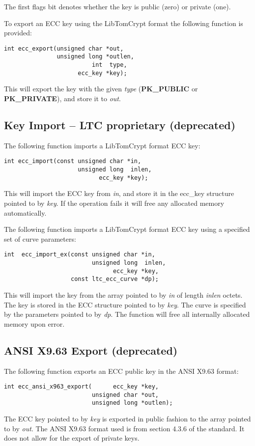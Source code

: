 \documentclass[synpaper]{book}
\begin{document}
The first flags bit denotes whether the key is public (zero) or private (one).

To export an ECC key using the LibTomCrypt format the following function is provided:
\begin{verbatim}
int ecc_export(unsigned char *out,
               unsigned long *outlen,
                         int  type,
                     ecc_key *key);
\end{verbatim}
This will export the key with the given \textit{type} (\textbf{PK\_PUBLIC} or \textbf{PK\_PRIVATE}), and store it to \textit{out}.

\subsection{Key Import -- LTC proprietary (deprecated)}

The following function imports a LibTomCrypt format ECC key:
\begin{verbatim}
int ecc_import(const unsigned char *in,
                     unsigned long  inlen,
                           ecc_key *key);
\end{verbatim}
This will import the ECC key from \textit{in}, and store it in the ecc\_key structure pointed to by \textit{key}.  If the operation fails it will free
any allocated memory automatically.

The following function imports a LibTomCrypt format ECC key using a specified set of curve parameters:
\begin{verbatim}
int  ecc_import_ex(const unsigned char *in,
                         unsigned long  inlen,
                               ecc_key *key,
                   const ltc_ecc_curve *dp);
\end{verbatim}
This will import the key from the array pointed to by \textit{in} of length \textit{inlen} octets.  The key is stored in
the ECC structure pointed to by \textit{key}.  The curve is specified by the parameters pointed to by \textit{dp}.  The function will free
all internally allocated memory upon error.

\subsection{ANSI X9.63 Export (deprecated)}
The following function exports an ECC public key in the ANSI X9.63 format:

\begin{verbatim}
int ecc_ansi_x963_export(      ecc_key *key,
                         unsigned char *out,
                         unsigned long *outlen);
\end{verbatim}
The ECC key pointed to by \textit{key} is exported in public fashion to the array pointed to by \textit{out}.  The ANSI X9.63 format used is from
section 4.3.6 of the standard.  It does not allow for the export of private keys.
\end{document}
